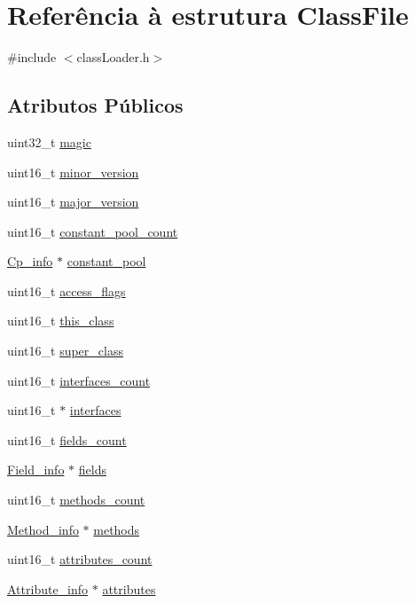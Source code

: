 \hypertarget{struct_class_file}{}\section{Referência à estrutura Class\+File}
\label{struct_class_file}


{\ttfamily \#include $<$class\+Loader.\+h$>$}

\subsection*{Atributos Públicos}
\begin{DoxyCompactItemize}
\item 
uint32\+\_\+t \hyperlink{struct_class_file_a9d4d72751ff9250dd3305d5d853f7921}{magic}
\item 
uint16\+\_\+t \hyperlink{struct_class_file_a357116b538d1b1ef11073560eba9396d}{minor\+\_\+version}
\item 
uint16\+\_\+t \hyperlink{struct_class_file_a931ebda6a22c18e009891d40016b2790}{major\+\_\+version}
\item 
uint16\+\_\+t \hyperlink{struct_class_file_a17e222c05279fafba8da96ef45ff8be2}{constant\+\_\+pool\+\_\+count}
\item 
\hyperlink{struct_cp__info}{Cp\+\_\+info} $\ast$ \hyperlink{struct_class_file_a79a3f2798c8da988fd7347db3c095d44}{constant\+\_\+pool}
\item 
uint16\+\_\+t \hyperlink{struct_class_file_a2d095ef980330834af44c587ce52590e}{access\+\_\+flags}
\item 
uint16\+\_\+t \hyperlink{struct_class_file_aa45abc9545fe11fca252d9769b665294}{this\+\_\+class}
\item 
uint16\+\_\+t \hyperlink{struct_class_file_aa48f683b6e5b60021410f88a5e831cbe}{super\+\_\+class}
\item 
uint16\+\_\+t \hyperlink{struct_class_file_a25f384f7a9746352aad90fb499126704}{interfaces\+\_\+count}
\item 
uint16\+\_\+t $\ast$ \hyperlink{struct_class_file_a86680de028c6df386edafa8e8436b92c}{interfaces}
\item 
uint16\+\_\+t \hyperlink{struct_class_file_a517d14b0d9e507f1485a3b6d3cb38683}{fields\+\_\+count}
\item 
\hyperlink{struct_field__info}{Field\+\_\+info} $\ast$ \hyperlink{struct_class_file_a6d6ec8aa668982ea722edc40b3ea5b1a}{fields}
\item 
uint16\+\_\+t \hyperlink{struct_class_file_a479310e3e0674d9171d24beb794fcb14}{methods\+\_\+count}
\item 
\hyperlink{struct_method__info}{Method\+\_\+info} $\ast$ \hyperlink{struct_class_file_a5906980e6c5121e5a864346fd3617083}{methods}
\item 
uint16\+\_\+t \hyperlink{struct_class_file_accd99ee441c45eb8fdcd3836d56e9ef4}{attributes\+\_\+count}
\item 
\hyperlink{struct_attribute__info}{Attribute\+\_\+info} $\ast$ \hyperlink{struct_class_file_a20d4b18030becbd8df5b7584477e94b6}{attributes}
\end{DoxyCompactItemize}


